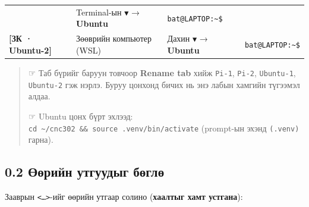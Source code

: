 \begin{longtable}[]{@{}llll@{}}
\begin{minipage}[t]{0.22\columnwidth}
\end{minipage} & \begin{minipage}[t]{0.22\columnwidth}\raggedright
Terminal-ын \texttt{▼} → \textbf{Ubuntu}\strut
\end{minipage} & \begin{minipage}[t]{0.22\columnwidth}\raggedright
\texttt{bat@LAPTOP:\textasciitilde{}\$}\strut
\end{minipage}\tabularnewline
\begin{minipage}[t]{0.22\columnwidth}\raggedright
\textbf{{[}ЗК · Ubuntu-2{]}}\strut
\end{minipage} & \begin{minipage}[t]{0.22\columnwidth}\raggedright
Зөөврийн компьютер (WSL)\strut
\end{minipage} & \begin{minipage}[t]{0.22\columnwidth}\raggedright
Дахин \texttt{▼} → \textbf{Ubuntu}\strut
\end{minipage} & \begin{minipage}[t]{0.22\columnwidth}\raggedright
\texttt{bat@LAPTOP:\textasciitilde{}\$}\strut
\end{minipage}\tabularnewline
\bottomrule
\end{longtable}\endgroup

\begin{quote}
☞ Таб бүрийг баруун товчоор \textbf{Rename tab} хийж \texttt{Pi-1}, \texttt{Pi-2}, \texttt{Ubuntu-1}, \texttt{Ubuntu-2} гэж нэрлэ. Буруу цонхонд бичих нь энэ лабын хамгийн түгээмэл алдаа.

☞ Ubuntu цонх бүрт эхлээд: \texttt{cd\ \textasciitilde{}/cnc302\ \&\&\ source\ .venv/bin/activate} (prompt-ын эхэнд \texttt{(.venv)} гарна).
\end{quote}

\hypertarget{ux4e9ux4e9ux440ux438ux439ux43d-ux443ux442ux433ux443ux443ux434ux44bux433-ux431ux4e9ux433ux43bux4e9}{%
\subsection{0.2 Өөрийн утгуудыг бөглө}\label{ux4e9ux4e9ux440ux438ux439ux43d-ux443ux442ux433ux443ux443ux434ux44bux433-ux431ux4e9ux433ux43bux4e9}}

Зааврын \texttt{\textless{}\ldots{}\textgreater{}}-ийг өөрийн утгаар солино (\textbf{хаалтыг хамт устгана}):

